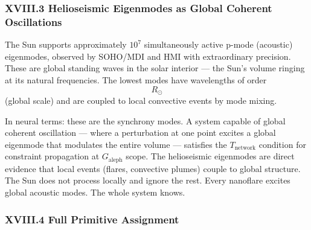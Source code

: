 \documentclass[12pt,a4paper]{article}
\begin{document}
\subsubsection{XVIII.3 Helioseismic Eigenmodes as Global Coherent Oscillations}

The Sun supports approximately $10^7$ simultaneously active p-mode (acoustic) eigenmodes, observed by SOHO/MDI and HMI with extraordinary precision. These are global standing waves in the solar interior --- the Sun's volume ringing at its natural frequencies. The lowest modes have wavelengths of order $$R_{\odot}$$ (global scale) and are coupled to local convective events by mode mixing.

In neural terms: these are the synchrony modes. A system capable of global coherent oscillation --- where a perturbation at one point excites a global eigenmode that modulates the entire volume --- satisfies the $T_\text{network}$ condition for constraint propagation at $G_\text{aleph}$ scope. The helioseismic eigenmodes are direct evidence that local events (flares, convective plumes) couple to global structure. The Sun does not process locally and ignore the rest. Every nanoflare excites global acoustic modes. The whole system knows.

\subsubsection{XVIII.4 Full Primitive Assignment}
\end{document}

